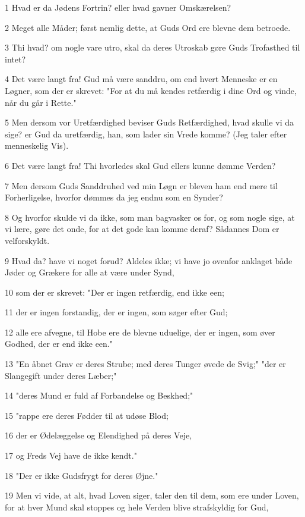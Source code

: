 \par 1 Hvad er da Jødens Fortrin? eller hvad gavner Omskærelsen?
\par 2 Meget alle Måder; først nemlig dette, at Guds Ord ere blevne dem betroede.
\par 3 Thi hvad? om nogle vare utro, skal da deres Utroskab gøre Guds Trofasthed til intet?
\par 4 Det være langt fra! Gud må være sanddru, om end hvert Menneske er en Løgner, som der er skrevet: "For at du må kendes retfærdig i dine Ord og vinde, når du går i Rette."
\par 5 Men dersom vor Uretfærdighed beviser Guds Retfærdighed, hvad skulle vi da sige? er Gud da uretfærdig, han, som lader sin Vrede komme? (Jeg taler efter menneskelig Vis).
\par 6 Det være langt fra! Thi hvorledes skal Gud ellers kunne dømme Verden?
\par 7 Men dersom Guds Sanddruhed ved min Løgn er bleven ham end mere til Forherligelse, hvorfor dømmes da jeg endnu som en Synder?
\par 8 Og hvorfor skulde vi da ikke, som man bagvasker os for, og som nogle sige, at vi lære, gøre det onde, for at det gode kan komme deraf? Sådannes Dom er velforskyldt.
\par 9 Hvad da? have vi noget forud? Aldeles ikke; vi have jo ovenfor anklaget både Jøder og Grækere for alle at være under Synd,
\par 10 som der er skrevet: "Der er ingen retfærdig, end ikke een;
\par 11 der er ingen forstandig, der er ingen, som søger efter Gud;
\par 12 alle ere afvegne, til Hobe ere de blevne uduelige, der er ingen, som øver Godhed, der er end ikke een."
\par 13 "En åbnet Grav er deres Strube; med deres Tunger øvede de Svig;" "der er Slangegift under deres Læber;"
\par 14 "deres Mund er fuld af Forbandelse og Beskhed;"
\par 15 "rappe ere deres Fødder til at udøse Blod;
\par 16 der er Ødelæggelse og Elendighed på deres Veje,
\par 17 og Freds Vej have de ikke kendt."
\par 18 "Der er ikke Gudsfrygt for deres Øjne."
\par 19 Men vi vide, at alt, hvad Loven siger, taler den til dem, som ere under Loven, for at hver Mund skal stoppes og hele Verden blive strafskyldig for Gud,
